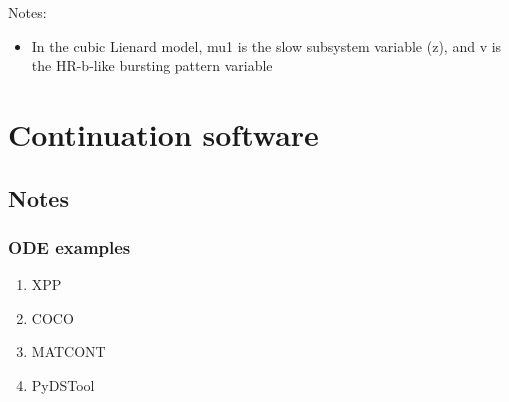 \documentclass[11pt]{article}
\begin{document}
Notes:
\begin{itemize}
\item In the cubic Lienard model, mu1 is the slow subsystem variable (z), and v is the HR-b-like bursting pattern variable
\end{itemize}

\newpage
\section{Continuation software}
\label{sec:org3e728e5}
\subsection{Notes}
\label{sec:org3eecbd7}
\subsubsection{ODE examples}
\label{sec:org0dcab1d}
\begin{enumerate}
\item XPP
\label{sec:orgc764553}
\item COCO
\label{sec:org72f9737}
\item MATCONT
\label{sec:org3eb519c}
\item PyDSTool
\label{sec:org569538b}
\end{enumerate}
\end{document}
